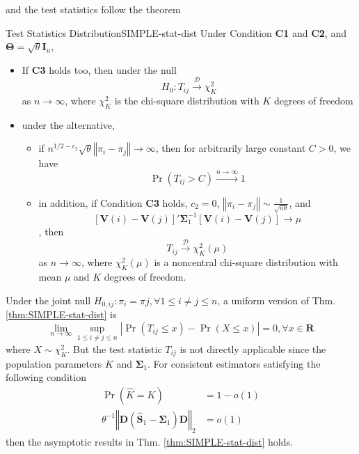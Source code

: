 \documentclass[twoside]{article}
\begin{document}
and the test statistics follow the theorem 
\begin{theorem}{Test Statistics Distribution}{SIMPLE-stat-dist}
    Under Condition \textbf{C1} and \textbf{C2}, and $\boldsymbol{\Theta} = \sqrt{\theta}\mathbf{I}_n$,
    \begin{itemize}
        \item If \textbf{C3} holds too, then under the null
        $$ H_0: T_{ij}\xrightarrow{\mathcal{D}} \chi^2_K $$
        as $n\rightarrow\infty$, where $\chi^2_K$ is the chi-square distribution with $K$ degrees of freedom
        \item under the alternative,
        \begin{itemize}
            \item if $n^{1/2-c_2}\sqrt{\theta}\left\Vert \pi_i -\pi_j \right\Vert \rightarrow \infty$, then for arbitrarily large constant $C>0$, we have $$\Pr\left(T_{ij}>C\right) \xrightarrow{n\rightarrow\infty} 1$$
            \item in addition, if Condition \textbf{C3} holds, $c_2=0$, $\left\Vert \pi_i-\pi_j \right\Vert \sim \frac{1}{\sqrt{n\theta}}$, and 
            $$ \left[\mathbf{V}(i)-\mathbf{V}(j)\right]'\boldsymbol{\Sigma}^{-1}_1 \left[\mathbf{V}(i)-\mathbf{V}(j)\right] \rightarrow \mu $$, then 
            $$
            T_{ij} \xrightarrow{\mathcal{D}} \chi^2_{K}(\mu)
            $$
            as $n\rightarrow \infty$, where $\chi^2_{K}(\mu)$ is a noncentral chi-square distribution with mean $\mu$ and $K$ degrees of freedom.
        \end{itemize}
    \end{itemize}
\end{theorem}
Under the joint null $H_{0,ij}: \pi_i=\pi j,\forall 1\leq i\neq j\leq n$, a uniform version of Thm.\ref{thm:SIMPLE-stat-dist} is 
$$
\lim_{n\rightarrow\infty} \sup_{1\leq i\neq j \leq n} \left\vert \Pr \left(T_{ij}\leq x \right) - \Pr \left( X\leq x \right) \right\vert =0,\forall x \in \mathbf{R}
$$
where $X\sim \chi^2_{K}$. But the test statistic $T_{ij}$ is not directly applicable since the population parameters $K$ and $\boldsymbol{\Sigma}_1$. For consistent 
estimators satisfying the following condition 
\begin{align*}
    \Pr(\hat{K}=K)&= 1-o(1)\\
    \theta^{-1}\left\Vert \mathbf{D}\left(\hat{\mathbf{S}}_1 - \boldsymbol{\Sigma}_1 \right) \mathbf{D} \right\Vert _2 &= o(1) 
\end{align*}
then the asymptotic results in Thm. \ref{thm:SIMPLE-stat-dist} holds.
\end{document}
